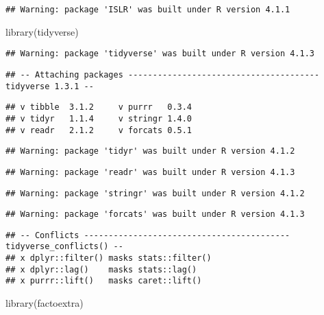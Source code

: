\documentclass[
]{article}
\newenvironment{Shaded}{\begin{snugshade}}{\end{snugshade}}
\newcommand{\FunctionTok}[1]{\textcolor[rgb]{0.00,0.00,0.00}{#1}}
\newcommand{\NormalTok}[1]{#1}
\begin{document}
\begin{verbatim}
## Warning: package 'ISLR' was built under R version 4.1.1
\end{verbatim}

\begin{Shaded}
\begin{Highlighting}[]
\FunctionTok{library}\NormalTok{(tidyverse)}
\end{Highlighting}
\end{Shaded}

\begin{verbatim}
## Warning: package 'tidyverse' was built under R version 4.1.3
\end{verbatim}

\begin{verbatim}
## -- Attaching packages --------------------------------------- tidyverse 1.3.1 --
\end{verbatim}

\begin{verbatim}
## v tibble  3.1.2     v purrr   0.3.4
## v tidyr   1.1.4     v stringr 1.4.0
## v readr   2.1.2     v forcats 0.5.1
\end{verbatim}

\begin{verbatim}
## Warning: package 'tidyr' was built under R version 4.1.2
\end{verbatim}

\begin{verbatim}
## Warning: package 'readr' was built under R version 4.1.3
\end{verbatim}

\begin{verbatim}
## Warning: package 'stringr' was built under R version 4.1.2
\end{verbatim}

\begin{verbatim}
## Warning: package 'forcats' was built under R version 4.1.3
\end{verbatim}

\begin{verbatim}
## -- Conflicts ------------------------------------------ tidyverse_conflicts() --
## x dplyr::filter() masks stats::filter()
## x dplyr::lag()    masks stats::lag()
## x purrr::lift()   masks caret::lift()
\end{verbatim}

\begin{Shaded}
\begin{Highlighting}[]
\FunctionTok{library}\NormalTok{(factoextra)}
\end{Highlighting}
\end{Shaded}
\end{document}
